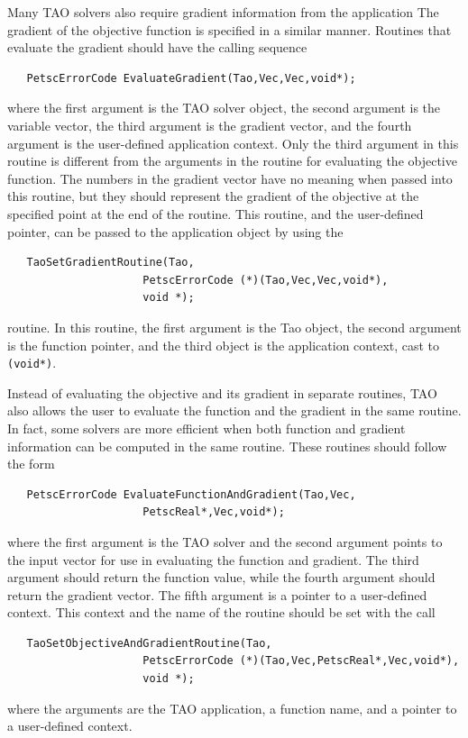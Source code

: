 \documentclass[]{book}
\begin{document}
Many TAO solvers also require gradient information from the 
application %
  The gradient of the objective function is specified in a similar manner.
Routines that evaluate the gradient should have the calling sequence
\begin{verbatim}
   PetscErrorCode EvaluateGradient(Tao,Vec,Vec,void*);
\end{verbatim}
\noindent
where the first
argument is the TAO solver object, the second argument is the variable
vector, the third argument is the gradient vector, and the fourth argument is
the user-defined application context.  Only the third argument in this
routine is different from the arguments in the routine for evaluating
the objective function.  The numbers in the gradient vector have no
meaning when passed into this routine, but they should represent the gradient
of the objective at the specified point at the end of the routine.
This routine, and the user-defined pointer, can be passed to the application
object by using the  %
\begin{verbatim}
   TaoSetGradientRoutine(Tao,
                     PetscErrorCode (*)(Tao,Vec,Vec,void*),
                     void *);
\end{verbatim}
routine. 
In this routine, the first argument is the Tao object, the second argument
is the function pointer, and the third object is the application context, cast
to {\tt (void*)}.

Instead of evaluating the objective and its gradient in separate
routines, TAO also allows the user to evaluate the function and the gradient
in the same routine.  In fact, some solvers are more efficient when
both function and gradient information can be computed in the same routine.
These routines should follow the form
\begin{verbatim}
   PetscErrorCode EvaluateFunctionAndGradient(Tao,Vec,
                     PetscReal*,Vec,void*);
\end{verbatim}
\noindent
where the first
argument is the TAO solver and the second
argument points to the input vector for use in evaluating the
function and gradient. The third argument should return the
function value, while the fourth argument should return the gradient vector.
The fifth argument is a pointer to a user-defined context.
This context and the name of the routine should be set with the
call %
\begin{verbatim}
   TaoSetObjectiveAndGradientRoutine(Tao,
                     PetscErrorCode (*)(Tao,Vec,PetscReal*,Vec,void*),
                     void *);
\end{verbatim}
where the arguments are the TAO application, a
function name, and a pointer to a user-defined context.
\end{document}
